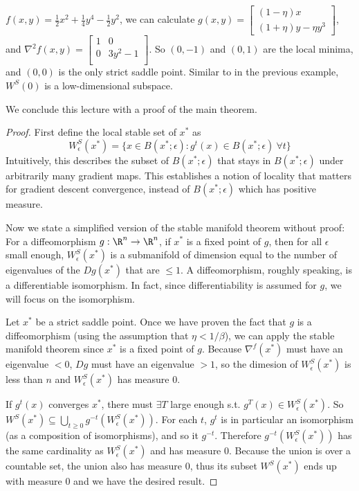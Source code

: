 \begin{example}
$f(x,y) = \frac{1}{2}x^2 + \frac{1}{4}y^4 - \frac{1}{2}y^2$, 
we can calculate
$g(x,y) = 
\begin{bmatrix}
(1-\eta)x\\
(1+\eta)y - \eta y^3 
\end{bmatrix}
$, and
$\nabla^2 f(x,y) = 
 \begin{bmatrix}
1 & 0 \\
0 & 3y^2-1 \\
\end{bmatrix}
$.
So $(0,-1)$ and $(0,1)$ are the local minima, and $(0,0)$ is the only strict saddle point. Similar to in the previous example, $W^S(0)$ is a low-dimensional subspace. 

We conclude this lecture with a proof of the main theorem.

\begin{proof}
First define the local stable set of $x^*$ as
$$
W^S_\epsilon(x^*) 
= \{ x\in B(x^*;\epsilon): g^t(x)\in B(x^*;\epsilon) ~\forall t \}
$$
Intuitively, this describes the subset of $B(x^*;\epsilon)$ that stays in $B(x^*;\epsilon)$ under arbitrarily many gradient maps. This establishes a notion of locality that matters for gradient descent convergence, instead of $B(x^*;\epsilon)$ which has positive measure.

Now we state a simplified version of the stable manifold theorem without proof: For a diffeomorphism $g:\R^n\rightarrow\R^n$, if $x^*$ is a fixed point of $g$, then for all $\epsilon$ small enough, $W^S_\epsilon(x^*)$ is a submanifold of dimension equal to the number of eigenvalues of the $Dg(x^*)$ that are $\leq 1$. A diffeomorphism, roughly speaking, is a differentiable isomorphism. In fact, since differentiability is assumed for $g$, we will focus on the isomorphism.

Let $x^*$ be a strict saddle point.
Once we have proven the fact that $g$ is a diffeomorphism (using the assumption that $\eta<1/\beta$), we can apply the stable manifold theorem since $x^*$ is a fixed point of $g$. 
Because $\nabla^f (x^*)$ must have an eigenvalue $<0$, $Dg$ must have an eigenvalue $>1$, so 
the dimesion of $W^S_\epsilon(x^*)$ is less than $n$ and $W^S_\epsilon(x^*)$ has measure 0. 

If $g^t(x)$ converges $x^*$, there must $\exists T$ large enough s.t. $g^T(x)\in W_\epsilon^S(x^*)$. 
So $W^S(x^*)\subseteq \bigcup_{t\geq 0 }g^{-t}(W_\epsilon^S(x^*))$.
For each $t$, $g^t$ is in particular an isomorphism (as a composition of isomorphisms), and so it $g^{-t}$.
Therefore $g^{-t}(W_\epsilon^S(x^*))$ has the same cardinality as 
$W_\epsilon^S(x^*)$ and has measure 0. Because the union is over a countable set, the union also has measure 0, thus its subset $W^S(x^*)$ ends up with measure 0 and we have the desired result.


\end{proof}
\end{example}
